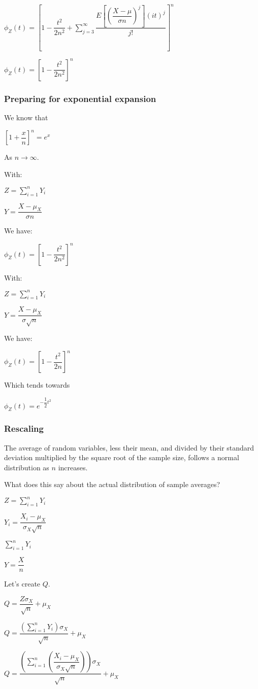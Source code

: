\(\phi_Z(t)=[1-\dfrac{t^2}{2n^2} +\sum_{j=3}^{\infty }\dfrac{E[(\dfrac{X-\mu}{\sigma n})^j](it)^j}{j!}]^n\)

\(\phi_Z(t)=[1-\dfrac{t^2}{2n^2}]^n\)

\subsubsection{Preparing for exponential expansion}

We know that

\([1+\dfrac{x}{n}]^n=e^x\)

As \(n \rightarrow \infty\).

With:

\(Z=\sum_{i=1}^nY_i\)

\(Y=\dfrac{X-\mu_X }{\sigma n}\)

We have:

\(\phi_Z(t)=[1-\dfrac{t^2}{2n^2}]^n\)

With:

\(Z=\sum_{i=1}^nY_i\)

\(Y=\dfrac{X-\mu_X }{\sigma \sqrt n}\)

We have:

\(\phi_Z(t)=[1-\dfrac{t^2}{2n}]^n\)

Which tends towards

\(\phi_Z(t)=e^{-\dfrac{1}{2}t^2}\)

\subsubsection{Rescaling}

The average of random variables, less their mean, and divided by their standard deviation multiplied by the square root of the sample size, follows a normal distribution as \(n\) increases.

What does this say about the actual distribution of sample averages?

\(Z=\sum_{i=1}^nY_i\)

\(Y_i=\dfrac{X_i-\mu_X }{\sigma_X \sqrt n}\)

\(\sum_{i=1}^nY_i\)

\(Y=\dfrac{X}{n}\)

Let's create \(Q\).

\(Q=\dfrac{Z\sigma_X }{\sqrt n}+\mu_X\)

\(Q=\dfrac{(\sum_{i=1}^nY_i)\sigma_X }{\sqrt n}+\mu_X\)

\(Q=\dfrac{(\sum_{i=1}^n(\dfrac{X_i-\mu_X }{\sigma_X \sqrt n}))\sigma_X }{\sqrt n}+\mu_X\)


